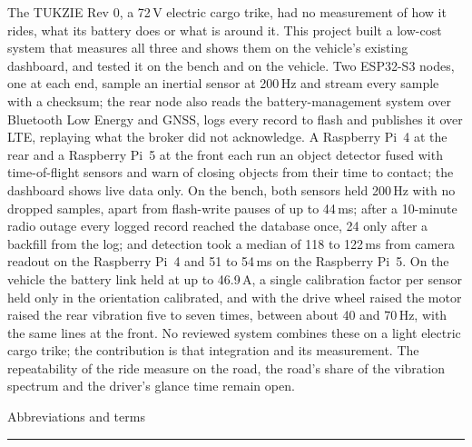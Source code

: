 \documentclass[a4paper,11pt]{report}
\begin{document}
{%
The TUKZIE Rev 0, a 72\,V electric cargo trike, had no measurement of how it rides, what its battery does or what is around it. This project built a low-cost system that measures all three and shows them on the vehicle's existing dashboard, and tested it on the bench and on the vehicle. Two ESP32-S3 nodes, one at each end, sample an inertial sensor at 200\,Hz and stream every sample with a checksum; the rear node also reads the battery-management system over Bluetooth Low Energy and GNSS, logs every record to flash and publishes it over LTE, replaying what the broker did not acknowledge. A Raspberry Pi~4 at the rear and a Raspberry Pi~5 at the front each run an object detector fused with time-of-flight sensors and warn of closing objects from their time to contact; the dashboard shows live data only. On the bench, both sensors held 200\,Hz with no dropped samples, apart from flash-write pauses of up to 44\,ms; after a 10-minute radio outage every logged record reached the database once, 24 only after a backfill from the log; and detection took a median of 118 to 122\,ms from camera readout on the Raspberry Pi~4 and 51 to 54\,ms on the Raspberry Pi~5. On the vehicle the battery link held at up to 46.9\,A, a single calibration factor per sensor held only in the orientation calibrated, and with the drive wheel raised the motor raised the rear vibration five to seven times, between about 40 and 70\,Hz, with the same lines at the front. No reviewed system combines these on a light electric cargo trike; the contribution is that integration and its measurement. The repeatability of the ride measure on the road, the road's share of the vibration spectrum and the driver's glance time remain open.


\newpage


\newpage
\tableofcontents
\vfill
{}

\newpage
{\Large Abbreviations and terms}\\
\hrule
{}

}
\end{document}
